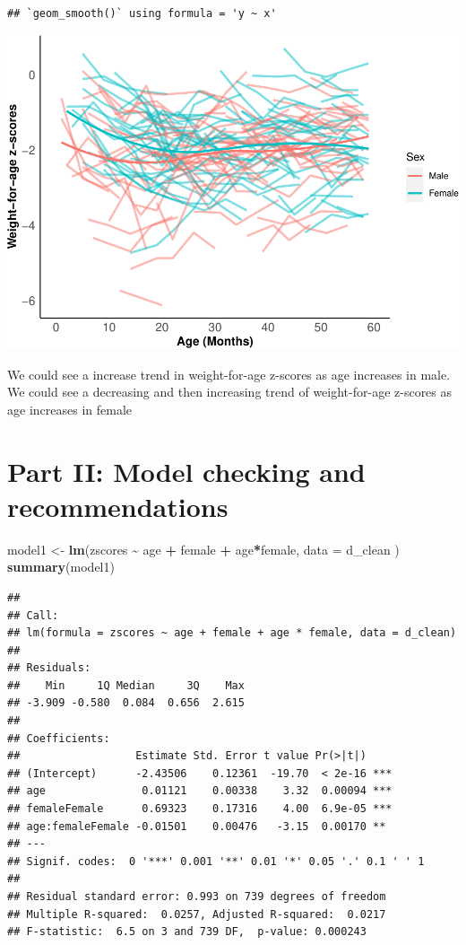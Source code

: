 \documentclass[
]{article}
\newenvironment{Shaded}{\begin{snugshade}}{\end{snugshade}}
\newcommand{\AttributeTok}[1]{\textcolor[rgb]{0.13,0.29,0.53}{#1}}
\newcommand{\FunctionTok}[1]{\textcolor[rgb]{0.13,0.29,0.53}{\textbf{#1}}}
\newcommand{\NormalTok}[1]{#1}
\newcommand{\OtherTok}[1]{\textcolor[rgb]{0.56,0.35,0.01}{#1}}
\newcommand{\SpecialCharTok}[1]{\textcolor[rgb]{0.81,0.36,0.00}{\textbf{#1}}}
\begin{document}
\begin{verbatim}
## `geom_smooth()` using formula = 'y ~ x'
\end{verbatim}

\includegraphics{ProblemSet3_Siyu_Zou_files/figure-latex/unnamed-chunk-5-1.pdf}

We could see a increase trend in weight-for-age z-scores as age
increases in male. We could see a decreasing and then increasing trend
of weight-for-age z-scores as age increases in female

\hypertarget{part-ii-model-checking-and-recommendations}{%
\section{Part II: Model checking and
recommendations}\label{part-ii-model-checking-and-recommendations}}

\begin{Shaded}
\begin{Highlighting}[]
\NormalTok{model1 }\OtherTok{\textless{}{-}} \FunctionTok{lm}\NormalTok{(zscores }\SpecialCharTok{\textasciitilde{}}\NormalTok{ age }\SpecialCharTok{+}\NormalTok{ female }\SpecialCharTok{+}\NormalTok{ age}\SpecialCharTok{*}\NormalTok{female, }\AttributeTok{data =}\NormalTok{ d\_clean )}
\FunctionTok{summary}\NormalTok{(model1)}
\end{Highlighting}
\end{Shaded}

\begin{verbatim}
## 
## Call:
## lm(formula = zscores ~ age + female + age * female, data = d_clean)
## 
## Residuals:
##    Min     1Q Median     3Q    Max 
## -3.909 -0.580  0.084  0.656  2.615 
## 
## Coefficients:
##                  Estimate Std. Error t value Pr(>|t|)    
## (Intercept)      -2.43506    0.12361  -19.70  < 2e-16 ***
## age               0.01121    0.00338    3.32  0.00094 ***
## femaleFemale      0.69323    0.17316    4.00  6.9e-05 ***
## age:femaleFemale -0.01501    0.00476   -3.15  0.00170 ** 
## ---
## Signif. codes:  0 '***' 0.001 '**' 0.01 '*' 0.05 '.' 0.1 ' ' 1
## 
## Residual standard error: 0.993 on 739 degrees of freedom
## Multiple R-squared:  0.0257, Adjusted R-squared:  0.0217 
## F-statistic:  6.5 on 3 and 739 DF,  p-value: 0.000243
\end{verbatim}
\end{document}
